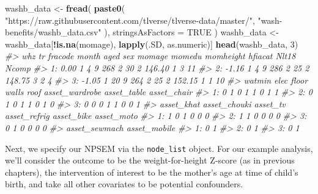 \documentclass[12pt, krantz2,]{krantz}
\newenvironment{Shaded}{\begin{snugshade}}{\end{snugshade}}
\newcommand{\CommentTok}[1]{\textcolor[rgb]{0.37,0.37,0.37}{\textit{#1}}}
\newcommand{\DataTypeTok}[1]{\textcolor[rgb]{0.27,0.27,0.27}{#1}}
\newcommand{\DecValTok}[1]{\textcolor[rgb]{0.06,0.06,0.06}{#1}}
\newcommand{\KeywordTok}[1]{\textcolor[rgb]{0.27,0.27,0.27}{\textbf{#1}}}
\newcommand{\NormalTok}[1]{#1}
\newcommand{\OperatorTok}[1]{\textcolor[rgb]{0.43,0.43,0.43}{\textbf{#1}}}
\newcommand{\OtherTok}[1]{\textcolor[rgb]{0.37,0.37,0.37}{#1}}
\newcommand{\StringTok}[1]{\textcolor[rgb]{0.5,0.5,0.5}{#1}}
\theoremstyle{definition}
\theoremstyle{definition}
\theoremstyle{definition}
\newcommand{\1}{\mathbbm{1}}
\begin{document}
\begin{Shaded}
\begin{Highlighting}[]
\NormalTok{washb_data <-}\StringTok{ }\KeywordTok{fread}\NormalTok{(}
  \KeywordTok{paste0}\NormalTok{(}
    \StringTok{"https://raw.githubusercontent.com/tlverse/tlverse-data/master/"}\NormalTok{,}
    \StringTok{"wash-benefits/washb_data.csv"}
\NormalTok{  ),}
  \DataTypeTok{stringsAsFactors =} \OtherTok{TRUE}
\NormalTok{)}
\NormalTok{washb_data <-}\StringTok{ }\NormalTok{washb_data[}\OperatorTok{!}\KeywordTok{is.na}\NormalTok{(momage), }\KeywordTok{lapply}\NormalTok{(.SD, as.numeric)]}
\KeywordTok{head}\NormalTok{(washb_data, }\DecValTok{3}\NormalTok{)}
\CommentTok{#>      whz tr fracode month aged sex momage momedu momheight hfiacat Nlt18 Ncomp}
\CommentTok{#> 1:  0.00  1       4     9  268   2     30      2    146.40       1     3    11}
\CommentTok{#> 2: -1.16  1       4     9  286   2     25      2    148.75       3     2     4}
\CommentTok{#> 3: -1.05  1      20     9  264   2     25      2    152.15       1     1    10}
\CommentTok{#>    watmin elec floor walls roof asset_wardrobe asset_table asset_chair}
\CommentTok{#> 1:      0    1     0     1    1              0           1           1}
\CommentTok{#> 2:      0    1     0     1    1              0           1           0}
\CommentTok{#> 3:      0    0     0     1    1              0           0           1}
\CommentTok{#>    asset_khat asset_chouki asset_tv asset_refrig asset_bike asset_moto}
\CommentTok{#> 1:          1            0        1            0          0          0}
\CommentTok{#> 2:          1            1        0            0          0          0}
\CommentTok{#> 3:          0            1        0            0          0          0}
\CommentTok{#>    asset_sewmach asset_mobile}
\CommentTok{#> 1:             0            1}
\CommentTok{#> 2:             0            1}
\CommentTok{#> 3:             0            1}
\end{Highlighting}
\end{Shaded}

Next, we specify our NPSEM via the \texttt{node\_list} object. For our example analysis,
we'll consider the outcome to be the weight-for-height Z-score (as in previous
chapters), the intervention of interest to be the mother's age at time of
child's birth, and take all other covariates to be potential confounders.

\begin{Shaded}
\end{Shaded}
\end{document}
